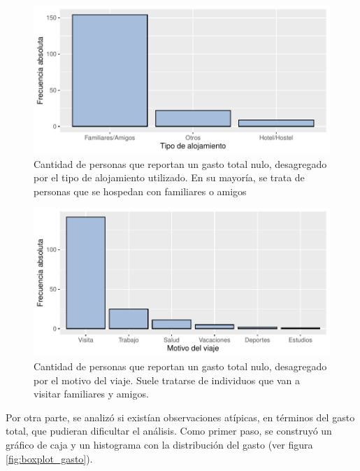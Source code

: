 \documentclass[
]{article}
\begin{document}
\begin{figure}[H]

{\centering \includegraphics{Informe-Proyectofinal_files/figure-latex/gasto_nulo_alojamiento-1} 

}

\caption{Cantidad de personas que reportan un gasto total nulo, desagregado por el tipo de alojamiento utilizado. En su mayoría, se trata de personas que se hospedan con familiares o amigos}\label{fig:gasto_nulo_alojamiento}
\end{figure}

\begin{figure}[H]

{\centering \includegraphics{Informe-Proyectofinal_files/figure-latex/gasto_nulo_motivo-1} 

}

\caption{Cantidad de personas que reportan un gasto total nulo, desagregado por el motivo del viaje. Suele tratarse de individuos que van a visitar familiares y amigos.}\label{fig:gasto_nulo_motivo}
\end{figure}

Por otra parte, se analizó si existían observaciones atípicas, en
términos del gasto total, que pudieran dificultar el análisis. Como
primer paso, se construyó un gráfico de caja y un histograma con la
distribución del gasto (ver figura \ref{fig:boxplot_gasto}).
\end{document}
